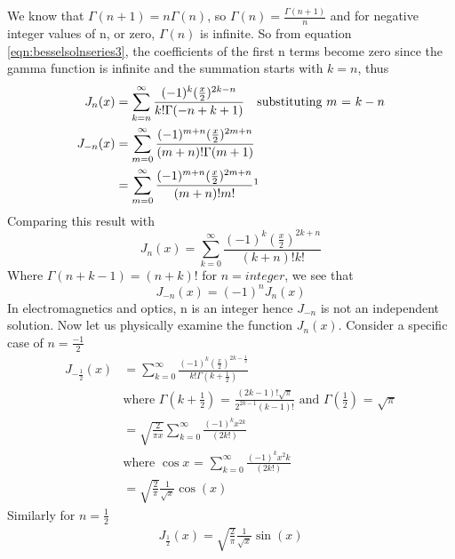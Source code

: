 We know that $\Gamma(n + 1) = n \Gamma(n)$, so 	$\Gamma(n) = \frac{\Gamma(n + 1)}{n} $ and for negative integer values of n, or zero, $\Gamma(n)$ is infinite. So from equation \ref{eqn:besselsolnseries3}, the coefficients of the first n terms become zero since the gamma function is infinite and the summation starts with $k=n$, thus
\begin{align*}
J_n(x) &= \sum_{k = n}^{\infty}\frac{(-1)^k (\frac{x}{2})^{2k - n}}{k! \Gamma(-n + k + 1)}\quad\text{substituting }m\text{ = }k - n\\
J_{-n}(x) &= \sum_{m = 0}^{\infty}\frac{(-1)^{m + n} (\frac{x}{2})^{2m + n}}{(m + n)! \Gamma(m + 1)}\\
&= \sum_{m = 0}^{\infty}\frac{(-1)^{m + n} (\frac{x}{2})^{2m + n}}{(m + n)! m!}\footnotemark
\end{align*}
Comparing this result with
\[
J_n(x) = \sum_{k = 0}^{\infty}\frac{(-1)^k (\frac{x}{2})^{2k + n}}{(k + n)! k!}
\]
Where $\Gamma(n + k - 1)=(n + k)!$ for $n= integer$, we see that
\begin{equation}
J_{-n}(x) = (-1)^n J_n(x)
\label{eqn:besselsolnseries4}
\end{equation}
In electromagnetics and optics, n is an integer hence $J_{-n}$ is not an independent solution. Now let us physically examine the function $J_n(x)$. Consider a specific case of $n = \frac{-1}{2}$
\begin{align*}
J_{-\frac{1}{2}}(x) &= \sum_{k = 0}^{\infty}\frac{(-1)^k (\frac{x}{2})^{2k - \frac{1}{2}}}{k! \Gamma( k + \frac{1}{2})}\\&\text{where }\Gamma\left( k + \frac{1}{2}\right)\text{ = }\frac{(2k - 1)! \sqrt{\pi}}{2^{2k - 1}(k - 1)!}\text{ and }\Gamma\left(\frac{1}{2}\right)\text{ = }\sqrt{\pi}\\
&= \sqrt{\frac{2}{\pi x}}\sum_{k = 0}^{\infty}\frac{(-1)^k x^{2k}}{(2k!)}\\&\text{where }\cos x\text{ = }\sum_{k = 0}^{\infty}\frac{(-1)^k x^2k}{(2k!)}\\
&= \sqrt{\frac{2}{\pi}}\frac{1}{\sqrt{x}}\cos(x)
\end{align*}
Similarly for $n = \frac{1}{2}$
\begin{align*}
J_{\frac{1}{2}}(x) = \sqrt{\frac{2}{\pi}}\frac{1}{\sqrt{x}}\sin(x)
\end{align*}

